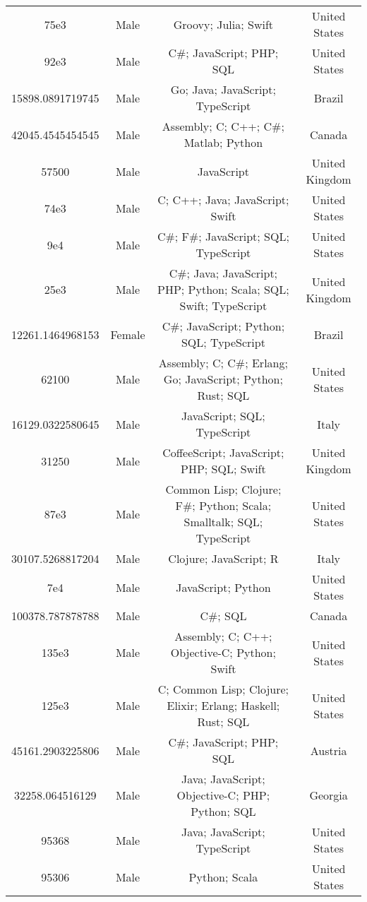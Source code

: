 \begin{center}
\begin{tabular}{ |c|c|c|c| }
75e3  &  Male  &  Groovy; Julia; Swift  &  United States  \\ 
92e3  &  Male  &  C\#; JavaScript; PHP; SQL  &  United States  \\ 
15898.0891719745  &  Male  &  Go; Java; JavaScript; TypeScript  &  Brazil  \\ 
42045.4545454545  &  Male  &  Assembly; C; C++; C\#; Matlab; Python  &  Canada  \\ 
57500  &  Male  &  JavaScript  &  United Kingdom  \\ 
74e3  &  Male  &  C; C++; Java; JavaScript; Swift  &  United States  \\ 
9e4  &  Male  &  C\#; F\#; JavaScript; SQL; TypeScript  &  United States  \\ 
25e3  &  Male  &  C\#; Java; JavaScript; PHP; Python; Scala; SQL; Swift; TypeScript  &  United Kingdom  \\ 
12261.1464968153  &  Female  &  C\#; JavaScript; Python; SQL; TypeScript  &  Brazil  \\ 
62100  &  Male  &  Assembly; C; C\#; Erlang; Go; JavaScript; Python; Rust; SQL  &  United States  \\ 
16129.0322580645  &  Male  &  JavaScript; SQL; TypeScript  &  Italy  \\ 
31250  &  Male  &  CoffeeScript; JavaScript; PHP; SQL; Swift  &  United Kingdom  \\ 
87e3  &  Male  &  Common Lisp; Clojure; F\#; Python; Scala; Smalltalk; SQL; TypeScript  &  United States  \\ 
30107.5268817204  &  Male  &  Clojure; JavaScript; R  &  Italy  \\ 
7e4  &  Male  &  JavaScript; Python  &  United States  \\ 
100378.787878788  &  Male  &  C\#; SQL  &  Canada  \\ 
135e3  &  Male  &  Assembly; C; C++; Objective-C; Python; Swift  &  United States  \\ 
125e3  &  Male  &  C; Common Lisp; Clojure; Elixir; Erlang; Haskell; Rust; SQL  &  United States  \\ 
45161.2903225806  &  Male  &  C\#; JavaScript; PHP; SQL  &  Austria  \\ 
32258.064516129  &  Male  &  Java; JavaScript; Objective-C; PHP; Python; SQL  &  Georgia  \\ 
95368  &  Male  &  Java; JavaScript; TypeScript  &  United States  \\ 
95306  &  Male  &  Python; Scala  &  United States  \\ 

\end{tabular}
\end{center}
